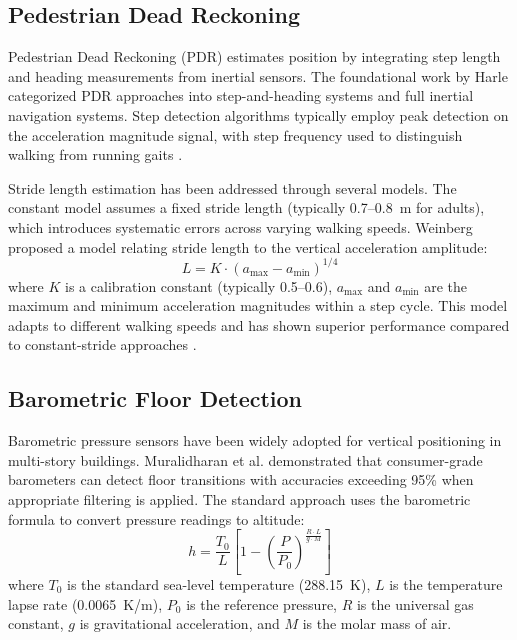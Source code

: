 \documentclass[journal,twocolumn]{IEEEtran}
\begin{document}
\subsection{Pedestrian Dead Reckoning}

Pedestrian Dead Reckoning (PDR) estimates position by integrating step length and heading measurements from inertial sensors. The foundational work by Harle \cite{harle2013survey} categorized PDR approaches into step-and-heading systems and full inertial navigation systems. Step detection algorithms typically employ peak detection on the acceleration magnitude signal, with step frequency used to distinguish walking from running gaits \cite{weinberg2002using}.

Stride length estimation has been addressed through several models. The constant model assumes a fixed stride length (typically 0.7--0.8~m for adults), which introduces systematic errors across varying walking speeds. Weinberg \cite{weinberg2002using} proposed a model relating stride length to the vertical acceleration amplitude:
\begin{equation}
    L = K \cdot (a_{\max} - a_{\min})^{1/4}
    \label{eq:weinberg}
\end{equation}
where $K$ is a calibration constant (typically 0.5--0.6), $a_{\max}$ and $a_{\min}$ are the maximum and minimum acceleration magnitudes within a step cycle. This model adapts to different walking speeds and has shown superior performance compared to constant-stride approaches \cite{tian2015enhanced}.

\subsection{Barometric Floor Detection}

Barometric pressure sensors have been widely adopted for vertical positioning in multi-story buildings. Muralidharan et al. \cite{muralidharan2014barometric} demonstrated that consumer-grade barometers can detect floor transitions with accuracies exceeding 95\% when appropriate filtering is applied. The standard approach uses the barometric formula to convert pressure readings to altitude:
\begin{equation}
    h = \frac{T_0}{L} \left[ 1 - \left(\frac{P}{P_0}\right)^{\frac{R \cdot L}{g \cdot M}} \right]
    \label{eq:hypsometric}
\end{equation}
where $T_0$ is the standard sea-level temperature (288.15~K), $L$ is the temperature lapse rate (0.0065~K/m), $P_0$ is the reference pressure, $R$ is the universal gas constant, $g$ is gravitational acceleration, and $M$ is the molar mass of air.
\end{document}
